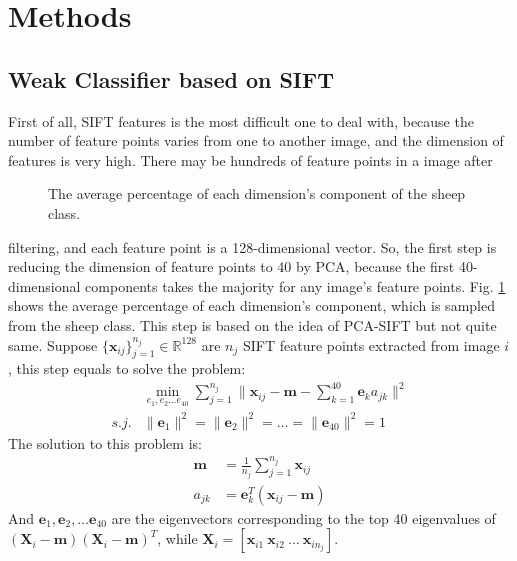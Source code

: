 \documentclass[conference]{IEEEtran}
\begin{document}
\section{Methods} 
\subsection{Weak Classifier based on SIFT}
First of all, SIFT features is the most difficult one to deal with, because the number of feature points varies from one to another image, and the dimension of features is very high. There may be hundreds of feature points in a image after  
\begin{figure}[H]
				\centering
				\caption{The average percentage of each dimension's component of the sheep class.  }\label{pca}
\end{figure}
\noindent filtering, and each feature point is a 128-dimensional vector. So, the first step is reducing the dimension of feature points to 40 by PCA, because the first 40-dimensional components takes the majority for any image's feature points. Fig. \ref{pca} shows the average percentage of each dimension's component, which is sampled from the sheep class. This step is based on the idea of PCA-SIFT but not quite same. Suppose $\{\mathbf{x}_{ij}\}^{n_j}_{j=1} \in \mathbb{R}^{128}$ are $n_j$ SIFT feature points extracted from image $i$, this step equals to solve the problem:
\begin{align}
	&\min_{e_1,e_2\dots  e_{40}}\sum\limits_{j=1}^{n_j} \|\mathbf{x}_{ij} - \mathbf{m} - \sum\limits_{k=1}^{40}\mathbf{e}_ka_{jk}\|^2\\
	s.j.& \|\mathbf{e}_1\|^2 = \|\mathbf{e}_2\|^2 = \dots = \|\mathbf{e}_{40}\|^2 = 1
\end{align}
The solution to this problem is:
\begin{align}
	\mathbf{m}& = \frac{1}{n_j}\sum\limits_{j=1}^{n_j}\mathbf{x}_{ij}\\
	a_{jk}& = \mathbf{e}_{k}^T(\mathbf{x}_{ij} - \mathbf{m})
\end{align}
And $\mathbf{e}_1,\mathbf{e}_2,\dots \mathbf{e}_{40}$ are the eigenvectors corresponding to the top 40 eigenvalues of $(\mathbf{X}_i-\mathbf{m})(\mathbf{X}_i-\mathbf{m})^T$, while $\mathbf{X}_i = [\mathbf{x}_{i1}\ \mathbf{x}_{i2}\ \dots \ \mathbf{x}_{in_j}]$.
\end{document}
